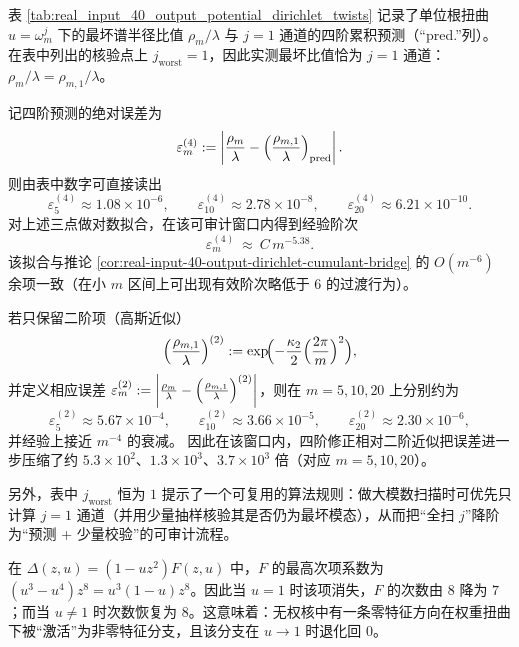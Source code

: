 

\begin{remark}\label{rem:real-input-40-dirichlet-cumulant-error-order}
表 \ref{tab:real_input_40_output_potential_dirichlet_twists} 记录了单位根扭曲 \(u=\omega_m^j\) 下的最坏谱半径比值 \(\rho_m/\lambda\) 与 \(j=1\) 通道的四阶累积预测（“pred.”列）。
在表中列出的核验点上 \(j_{\mathrm{worst}}=1\)，因此实测最坏比值恰为 \(j=1\) 通道：\(\rho_m/\lambda=\rho_{m,1}/\lambda\)。
\par
\noindent 记四阶预测的绝对误差为
\[
\varepsilon_m^{(4)}:=\left\lvert\frac{\rho_m}{\lambda}-\Bigl(\frac{\rho_{m,1}}{\lambda}\Bigr)_{\mathrm{pred}}\right\rvert.
\]
则由表中数字可直接读出
\[
\varepsilon_{5}^{(4)}\approx 1.08\times 10^{-6},\qquad
\varepsilon_{10}^{(4)}\approx 2.78\times 10^{-8},\qquad
\varepsilon_{20}^{(4)}\approx 6.21\times 10^{-10}.
\]
对上述三点做对数拟合，在该可审计窗口内得到经验阶次
\[
\varepsilon_m^{(4)}\ \approx\ C\,m^{-5.38}.
\]
该拟合与推论 \ref{cor:real-input-40-output-dirichlet-cumulant-bridge} 的 \(O(m^{-6})\) 余项一致（在小 \(m\) 区间上可出现有效阶次略低于 \(6\) 的过渡行为）。
\par
\noindent 若只保留二阶项（高斯近似）
\[
\Bigl(\frac{\rho_{m,1}}{\lambda}\Bigr)^{(2)}
:=\exp\!\Bigl(
-\frac{\kappa_2}{2}\Bigl(\frac{2\pi}{m}\Bigr)^2
\Bigr),
\]
并定义相应误差 \(\varepsilon_m^{(2)}:=\left\lvert\frac{\rho_m}{\lambda}-\Bigl(\frac{\rho_{m,1}}{\lambda}\Bigr)^{(2)}\right\rvert\)，则在 \(m=5,10,20\) 上分别约为
\[
\varepsilon_{5}^{(2)}\approx 5.67\times 10^{-4},\qquad
\varepsilon_{10}^{(2)}\approx 3.66\times 10^{-5},\qquad
\varepsilon_{20}^{(2)}\approx 2.30\times 10^{-6},
\]
并经验上接近 \(m^{-4}\) 的衰减。
因此在该窗口内，四阶修正相对二阶近似把误差进一步压缩了约 \(5.3\times10^2\)、\(1.3\times10^3\)、\(3.7\times10^3\) 倍（对应 \(m=5,10,20\)）。
\par
\noindent 另外，表中 \(j_{\mathrm{worst}}\) 恒为 \(1\) 提示了一个可复用的算法规则：做大模数扫描时可优先只计算 \(j=1\) 通道（并用少量抽样核验其是否仍为最坏模态），从而把“全扫 \(j\)”降阶为“预测 + 少量校验”的可审计流程。
\end{remark}

\begin{remark}[权重激活的零特征分支]\label{rem:real-input-40-zero-activation}
在 $\Delta(z,u)=(1-uz^2)F(z,u)$ 中，$F$ 的最高次项系数为 $(u^3-u^4)z^8=u^3(1-u)z^8$。因此当 $u=1$ 时该项消失，$F$ 的次数由 $8$ 降为 $7$；而当 $u\neq 1$ 时次数恢复为 $8$。这意味着：无权核中有一条零特征方向在权重扭曲下被“激活”为非零特征分支，且该分支在 $u\to 1$ 时退化回 $0$。
\end{remark}

